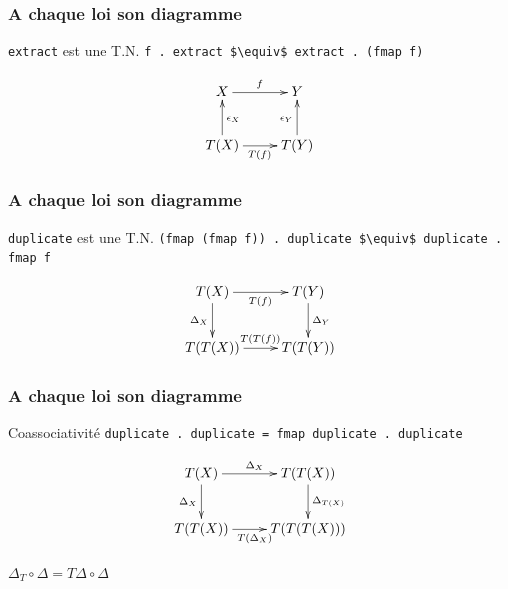 \documentclass{beamer}
\begin{document}
\begin{frame}
\frametitle{A chaque loi son diagramme}
\begin{alertblock}{\verb!extract! est une T.N.}
\verb!f . extract $\equiv$ extract . (fmap f)!
\end{alertblock}

\begin{block}{}
\[
\xymatrix{
X \ar[r]^{f} & Y  \\
T(X) \ar[r]_{T(f)} \ar[u]_{\epsilon_X} & T(Y) \ar[u]^{\epsilon_Y}\\
}
\]
\end{block}

\end{frame}

\begin{frame}
\frametitle{A chaque loi son diagramme}
\begin{alertblock}{\verb!duplicate! est une T.N.}
\verb!(fmap (fmap f)) . duplicate $\equiv$ duplicate . fmap f!
\end{alertblock}

\begin{block}{}
\[
\xymatrix{
T(X) \ar[r]_{T(f)} \ar[d]_{\Delta_{X}} & T(Y) \ar[d]^{\Delta_{Y}} \\
T(T(X)) \ar[r]^{T(T(f))} & T(T(Y)) \\
}
\]
\end{block}

\end{frame}


\begin{frame}
\frametitle{A chaque loi son diagramme}
\begin{alertblock}{Coassociativité}
\verb!duplicate . duplicate = fmap duplicate . duplicate!
\end{alertblock}

\begin{block}{}

\[
\xymatrix{
T(X) \ar[r]^{\Delta_X} \ar[d]_{\Delta_X} & T(T(X)) \ar[d]^{\Delta_{T(X)}} \\
T(T(X)) \ar[r]_{T(\Delta_X)} & T(T(T(X))) \\
}
\]
\end{block}

\begin{block}{}
\begin{center}
$\Delta_T \circ \Delta = T\Delta \circ \Delta$
\end{center}
\end{block}

\end{frame}
\end{document}
